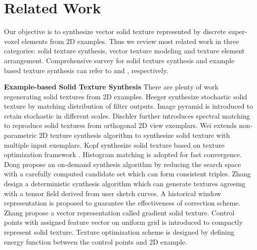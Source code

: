 \section{Related Work}
\label{sec:relarted}

Our objective is to synthesize vector solid texture represented by discrete super-voxel elements from 2D examples. Thus we review most related work in three categories: solid texture synthesis, vector texture modeling and texture element arrangement. Comprehensive survey for solid texture synthesis and example based texture synthesis can refer to \cite{pietroni2010solid} and \cite{wei2009state}, respectively.

\noindent
\textbf{Example-based Solid Texture Synthesis}
There are plenty of work regenerating solid textures from 2D examples.
Heeger \etal \cite{heeger1995pyramid} synthesize stochastic solid texture by matching distribution of filter outputs. Image pyramid is introduced to retain stochastic in different scales. 
Dischler \etal \cite{dischler1998anisotropic} further introduces spectral matching to reproduce solid textures from orthogonal 2D view exemplars. 
Wei \cite{wei2003texture} extends non-parametric 2D texture synthesis algorithm \cite{wei2000fast} to synthesize solid texture with multiple input exemplars.
Kopf \etal \cite{kopf2007solid} synthesize solid texture based on texture optimization framework \cite{kwatra2005texture}. Histogram matching is adopted for fast convergence.
Dong \etal \cite{dong2008lazy} propose an on-demand synthesis algorithm by reducing the search space with a carefully computed candidate set which can form consistent triples. Zhang \etal \cite{zhang2011sketch} design a deterministic synthesis algorithm which can generate textures agreeing with a tensor field derived from user sketch curves. A historical window representation is proposed to guarantee the effectiveness of correction scheme. Zhang \etal \cite{zhang2013efficient} propose a vector representation called gradient solid texture. Control points with assigned feature vector on uniform grid is introduced to compactly represent solid texture. Texture optimization scheme is designed by defining energy function between the control points and 2D example.

